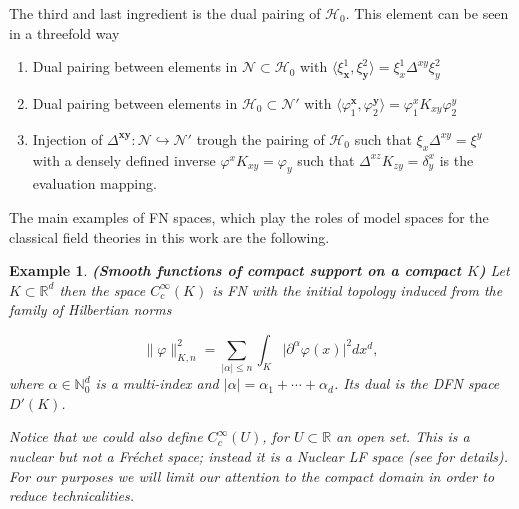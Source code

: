 \documentclass[12pt]{article}%
\newtheorem{example}{Example}%
\begin{document}
The third and last ingredient is the dual pairing of $\mathcal{H}_0$. This element can be seen in a threefold way
\begin{enumerate}[label=\alph*)]
    \item Dual pairing between elements in $\mathcal{N}\subset \mathcal{H}_0$ with $\langle\xi^1_{\mathbf{x}} ,\xi^2_{\mathbf{y}}\rangle =\xi^1_x\Delta^{xy}\xi_y^2$
    \item Dual pairing between elements in  $ \mathcal{H}_0\subset \mathcal{N}'$ with $\langle\varphi_1^{\mathbf{x}} ,\varphi_2^{\mathbf{y}}\rangle =\varphi_1^xK_{xy}\varphi^y_2$ 
    \item Injection of ${\Delta^{\mathbf{xy}}}:\mathcal{N}\hookrightarrow \mathcal{N}'$ trough the pairing of $\mathcal{H}_0$ such that $\xi_x\Delta^{xy}=\xi^y$ with a densely defined inverse $\varphi^xK_{xy}=\varphi_y$ such that $\Delta^{xz}K_{zy}=\delta^x_y$ is the evaluation mapping.
\end{enumerate}


The main examples of FN spaces, which play the roles of model spaces for the classical field theories in this work are the following.

\begin{example}\label{ex:testFunctions}{\bf (Smooth functions of compact support on a compact $K$)}
    Let $K\subset \mathbb{R}^d$ then the space $C^{\infty}_c(K)$ is FN with the initial topology induced from the family of Hilbertian norms

\begin{equation}
\label{eq:hilbertianNormsCompactSupport}
\lVert\varphi\rVert_{K,n}^2=\sum_{\lvert\alpha\rvert\leq n}\int_{K}\lvert\partial^\alpha\varphi(x)\rvert^2 dx^d,
\end{equation}
where $\alpha\in \mathbb{N}_0^d$ is a multi-index and $\lvert\alpha\rvert=\alpha_1+\cdots+\alpha_d$.  Its dual is the DFN space $D'(K)$. 

Notice that we could also define $C^\infty_c(U)$, for $U\subset \mathbb{R}$ an open set. This is a nuclear  but not  a Fréchet space; instead it is a Nuclear LF space (see \cite{Gellfand} for details). For our purposes we will limit our attention to the compact domain in order to reduce  technicalities.
\end{example}
\end{document}
